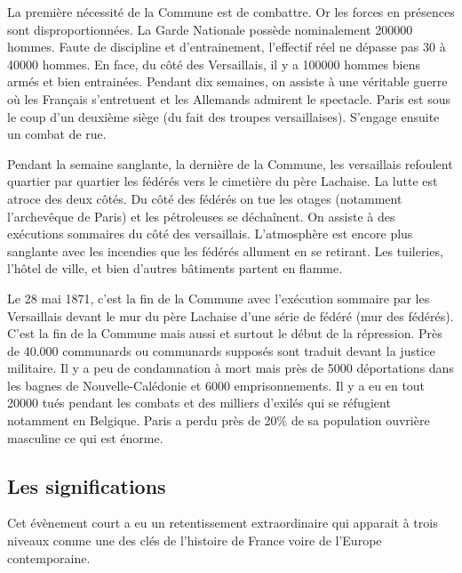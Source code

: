 \documentclass[12pt]{report}
\begin{document}
La première nécessité de la Commune est de combattre. Or les forces en présences sont
disproportionnées. La Garde Nationale possède nominalement 200000 hommes. Faute de
discipline et d’entrainement, l’effectif réel ne dépasse pas 30 à 40000 hommes. En face, du
côté des Versaillais, il y a 100000 hommes biens armés et bien entrainées. Pendant dix
semaines, on assiste à une véritable guerre où les Français s’entretuent et les Allemands
admirent le spectacle. Paris est sous le coup d’un deuxième siège (du fait des troupes
versaillaises). S’engage ensuite un combat de rue.

Pendant la semaine sanglante, la dernière de la Commune, les versaillais refoulent quartier par
quartier les fédérés vers le cimetière du père Lachaise. La lutte est atroce des deux côtés. Du
côté des fédérés on tue les otages (notamment l’archevêque de Paris) et les pétroleuses se
déchaînent. On assiste à des exécutions sommaires du côté des versaillais. L’atmosphère est
encore plus sanglante avec les incendies que les fédérés allument en se retirant. Les tuileries,
l’hôtel de ville, et bien d’autres bâtiments partent en flamme.

Le 28 mai 1871, c’est la fin de la Commune avec l’exécution sommaire par les Versaillais
devant le mur du père Lachaise d’une série de fédéré (mur des fédérés). C’est la fin de la
Commune mais aussi et surtout le début de la répression. Près de 40.000 communards ou
communards supposés sont traduit devant la justice militaire. Il y a peu de condamnation à
mort mais près de 5000 déportations dans les bagnes de Nouvelle-Calédonie et 6000
emprisonnements. Il y a eu en tout 20000 tués pendant les combats et des milliers d’exilés
qui se réfugient notamment en Belgique. Paris a perdu près de 20\% de sa population ouvrière
masculine ce qui est énorme.

\subsection{Les significations}

Cet évènement court a eu un retentissement extraordinaire qui apparait à trois niveaux
comme une des clés de l’histoire de France voire de l’Europe contemporaine.
\end{document}
